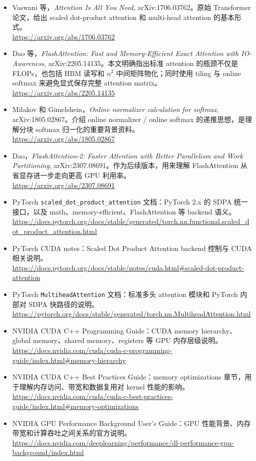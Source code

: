 \begingroup
\small
\sloppy
\begin{itemize}[leftmargin=1.5em]
  \item Vaswani 等，\emph{Attention Is All You Need}, arXiv:1706.03762。原始 Transformer 论文，给出 scaled dot-product attention 和 multi-head attention 的基本形式。\\
  \url{https://arxiv.org/abs/1706.03762}
  \item Dao 等，\emph{FlashAttention: Fast and Memory-Efficient Exact Attention with IO-Awareness}, arXiv:2205.14135。本文明确指出标准 attention 的瓶颈不仅是 FLOPs，也包括 HBM 读写和 $n^2$ 中间矩阵物化；同时使用 tiling 与 online softmax 来避免显式保存完整 attention matrix。\\
  \url{https://arxiv.org/abs/2205.14135}
  \item Milakov 和 Gimelshein，\emph{Online normalizer calculation for softmax}, arXiv:1805.02867。介绍 online normalizer / online softmax 的递推思想，是理解分块 softmax 归一化的重要背景资料。\\
  \url{https://arxiv.org/abs/1805.02867}
  \item Dao，\emph{FlashAttention-2: Faster Attention with Better Parallelism and Work Partitioning}, arXiv:2307.08691。作为后续版本，用来理解 FlashAttention 从省显存进一步走向更高 GPU 利用率。\\
  \url{https://arxiv.org/abs/2307.08691}
  \item PyTorch \texttt{scaled\_dot\_product\_attention} 文档：PyTorch 2.x 的 SDPA 统一接口，以及 math、memory-efficient、FlashAttention 等 backend 语义。\\
  \url{https://docs.pytorch.org/docs/stable/generated/torch.nn.functional.scaled_dot_product_attention.html}
  \item PyTorch CUDA notes：Scaled Dot Product Attention backend 控制与 CUDA 相关说明。\\
  \url{https://docs.pytorch.org/docs/stable/notes/cuda.html#scaled-dot-product-attention}
  \item PyTorch \texttt{MultiheadAttention} 文档：标准多头 attention 模块和 PyTorch 内部对 SDPA 快路径的说明。\\
  \url{https://pytorch.org/docs/stable/generated/torch.nn.MultiheadAttention.html}
  \item NVIDIA CUDA C++ Programming Guide：CUDA memory hierarchy、global memory、shared memory、registers 等 GPU 内存层级说明。\\
  \url{https://docs.nvidia.com/cuda/cuda-c-programming-guide/index.html#memory-hierarchy}
  \item NVIDIA CUDA C++ Best Practices Guide：memory optimizations 章节，用于理解内存访问、带宽和数据复用对 kernel 性能的影响。\\
  \url{https://docs.nvidia.com/cuda/cuda-c-best-practices-guide/index.html#memory-optimizations}
  \item NVIDIA GPU Performance Background User's Guide：GPU 性能背景、内存带宽和计算吞吐之间关系的官方说明。\\
  \url{https://docs.nvidia.com/deeplearning/performance/dl-performance-gpu-background/index.html}
\end{itemize}
\endgroup

